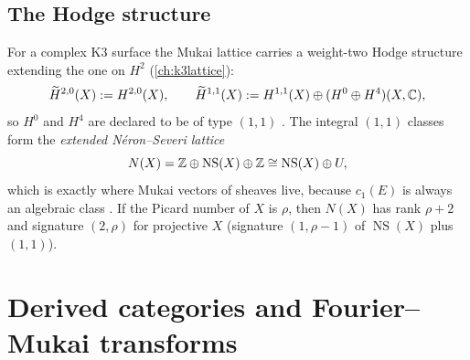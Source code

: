 \subsection{The Hodge structure}
For a complex K3 surface the Mukai lattice carries a weight-two Hodge structure
 extending the one on $H^2$ (\cref{ch:k3lattice}):
\begin{equation}\label{eq:mukai:hodge}
  \widetilde H^{2,0}(X):=H^{2,0}(X),\qquad
  \widetilde H^{1,1}(X):=H^{1,1}(X)\oplus(H^0\oplus H^4)(X,\mathbb{C}),
\end{equation}
so $H^0$ and $H^4$ are declared to be of type $(1,1)$ . The integral $(1,1)$ classes form the \emph{extended N\'eron--Severi lattice}
\begin{equation}\label{eq:mukai:NX}
  N(X)=\mathbb{Z}\oplus\operatorname{NS}(X)\oplus\mathbb{Z}\cong\operatorname{NS}(X)\oplus U,
\end{equation}
which is exactly where Mukai vectors of sheaves live, because $c_1(E)$ is always an algebraic
class . If the Picard number
of $X$ is $\rho$, then $N(X)$ has rank $\rho+2$ and signature $(2,\rho)$ for projective $X$
(signature $(1,\rho-1)$ of $\operatorname{NS}(X)$ plus $(1,1)$).

\section{Derived categories and Fourier--Mukai transforms}\label{sec:mukai:fm}

